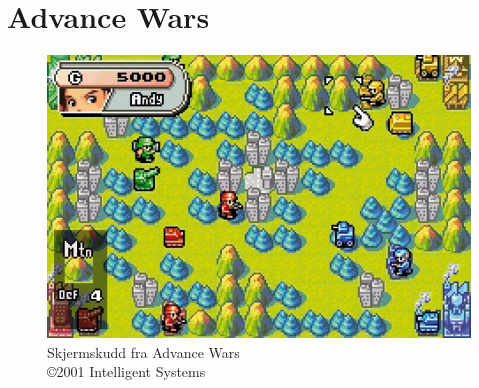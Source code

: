 \section{Advance Wars} \label{app:aw}
\begin{figure} [H]
		\begin{center}
		\includegraphics[width=\textwidth]{images/screenshot_aw}
		\caption{Skjermskudd fra Advance Wars \\ \copyright 2001 Intelligent Systems}
		\end{center}
	\end{figure}